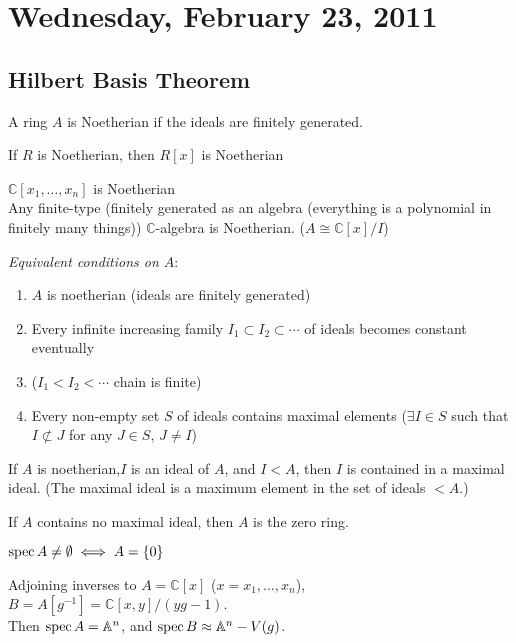 \documentclass [letterpaper,11pt,twoside]{article}
\begin{document}
\setcounter {section}{8}\section {Wednesday, February 23, 2011}
  \subsection*{Hilbert Basis Theorem}
    A ring $A$ is Noetherian if the ideals are finitely generated.

    \begin{thm*}
      If $R$ is Noetherian, then $R[x]$ is Noetherian
    \end{thm*}
    \begin{cor*}
      $\mathbb C[x_1,\ldots, x_n]$ is Noetherian \\
      Any finite-type (finitely generated as an algebra (everything is a polynomial in finitely many things)) $\mathbb C$-algebra is Noetherian.  ($A \cong \mathbb C[x] / I$)
    \end{cor*}

    \noindent \emph{Equivalent conditions on $A$}:
    \begin{enumerate}
      \item $A$ is noetherian (ideals are finitely generated)
      \item Every infinite increasing family $I_1 \subset I_2 \subset \cdots $ of ideals becomes constant eventually
      \item[] ($I_1 < I_2 < \cdots$ chain is finite)
      \item Every non-empty set $S$ of ideals contains maximal elements ($\exists I \in S$ such that $I \not\subset J$ for any $J \in S$, $J \ne I$)
    \end{enumerate}
    \begin{cor*}
      If $A$ is noetherian,$I$ is an ideal of $A$,  and $I < A$, then $I$ is contained in a maximal ideal.  (The maximal ideal is a maximum element in the set of ideals $< A$.)
    \end{cor*}
    \begin{cor*}
      If $A$ contains no maximal ideal, then $A$ is the zero ring.

      $\operatorname{spec} A \ne \emptyset \iff A = \{0\}$
    \end{cor*}

    Adjoining inverses to $A = \mathbb C[x]$ ($x = x_1, \ldots, x_n$), $B = A[g^{-1}] = \mathbb C[x, y] / (y g - 1)$.  \\
    Then $\operatorname{spec} A = \mathbb A^n$, and $\operatorname{spec} B \approx \mathbb A^n - V(g)$.
\end{document}
